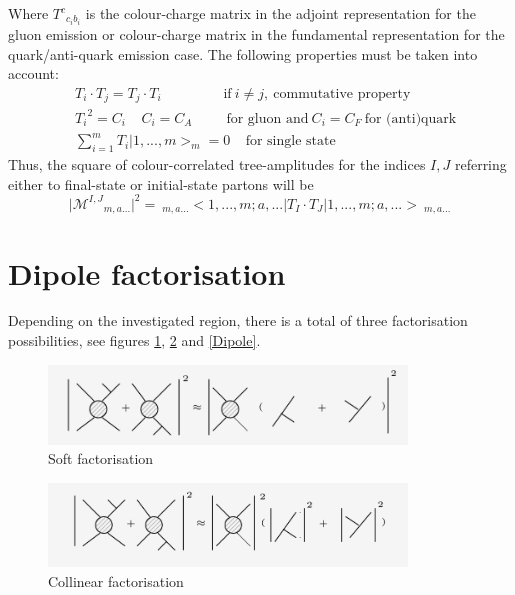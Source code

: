 Where $ {T^c}_{c_ib_i} $ is the colour-charge matrix in the adjoint representation for the gluon emission or colour-charge matrix in the fundamental representation for the quark/anti-quark emission case. The following properties must be taken into account:
\begin{equation}
\begin{split}
&T_i \cdot T_j = T_j \cdot T_i \:\:\:\:\:\:\:\:\:\:\:\:\:\:\:\:\:\:\:\:\text{if}\:i\neq j,\: \text{commutative property}\\
& {T_i}^2 = C_i\:\:\:\:\:C_i = C_A \:\:\:\:\:\:\:\:\:\:\:\text{for gluon and} \: C_i = C_F\:\text{for (anti)quark}\\
&\sum_{i=1}^m T_i |1,...,m>_m =0 \:\:\:\:\:\text{for single state}
\end{split}
\end{equation}
Thus, the square of colour-correlated tree-amplitudes for the indices $I,  J$ referring either to final-state or initial-state partons will be~\cite{Catani:1996vz, Catani:2002hc}
\begin{equation}
\vert {{\mathcal{M}}^{I,J}}_{m,a...} \vert^2=\:_{m,a...} < 1,...,m;a,... |T_I \cdot T_J | 1,...,m;a,... >\:_{m,a...}
\end{equation}


\pagebreak
\section*{Dipole factorisation}
Depending on the investigated region, there is a total of three factorisation possibilities, see figures \ref{soft}, \ref{Collinear} and \ref{Dipole}.
\begin{figure}[h!]
\centering
\includegraphics[width=0.85\textwidth]{images/Intro/soft.png}
\caption{Soft factorisation}
\label{soft}
\end{figure}

\begin{figure}[h!]
\centering
\includegraphics[width=0.85\textwidth]{images/Intro/collinear.png}
\caption{Collinear factorisation}
\label{Collinear}
\end{figure}

